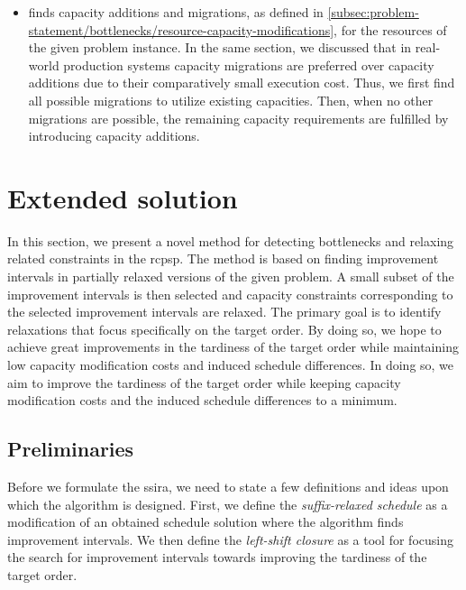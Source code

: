 \begin{itemize}
    \item {}
        finds capacity additions and migrations,
        as defined in \cref{subsec:problem-statement/bottlenecks/resource-capacity-modifications},
        for the resources of the given problem instance.
        In the same section,
        we discussed that in real-world production systems
        capacity migrations are preferred over capacity additions due to their comparatively small execution cost.
        Thus, we first find all possible migrations to utilize existing capacities.
        Then, when no other migrations are possible, the remaining capacity requirements are fulfilled
        by introducing capacity additions.
\end{itemize}


\section{Extended solution} \label{sec:solution-apporach/extended-solution}

In this section, we present a novel method for detecting bottlenecks
and relaxing related constraints in the \ac{rcpsp}.
The method is based on finding improvement intervals
in partially relaxed versions of the given problem.
A small subset of the improvement intervals is then selected and capacity constraints
corresponding to the selected improvement intervals are relaxed.
The primary goal is to identify relaxations that focus specifically on the target order.
By doing so, we hope to achieve great improvements in the tardiness of the target order
while maintaining low capacity modification costs and induced schedule differences.
In doing so, we aim to improve the tardiness of the target order
while keeping capacity modification costs and the induced schedule differences to a minimum.

\subsection{Preliminaries} \label{subsec:solution-approach/extended-solutin/preliminaries}

Before we formulate the \acl{ssira},
we need to state a few definitions and ideas upon which the algorithm is designed.
First, we define the \emph{suffix-relaxed schedule} as a modification of an obtained schedule solution
where the algorithm finds improvement intervals.
We then define the \emph{left-shift closure} as a tool
for focusing the search for improvement intervals towards improving the tardiness of the target order.


